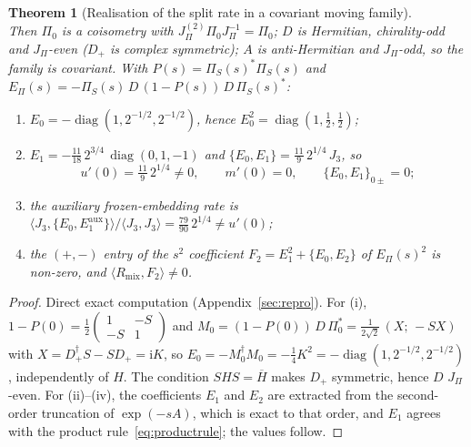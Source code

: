 \documentclass[11pt]{article}
\newtheorem{theorem}{Theorem}
\theoremstyle{definition}
\theoremstyle{remark}
\newcommand{\JPi}{J_{\Pi}}
\newcommand{\Jthree}{J_{3}}
\newcommand{\Rmix}{R_{\mathrm{mix}}}
\newcommand{\Epi}{E_{\Pi}}
\newcommand{\PiS}{\Pi_{S}}
\newcommand{\diag}{\operatorname{diag}}
\begin{document}
\begin{theorem}[Realisation of the split rate in a covariant moving family]
\[      \]
      Then $\Pi_0$ is a coisometry with $\JPi^{(2)} \Pi_0 \JPi^{-1} = \Pi_0$; $D$ is Hermitian, chirality-odd and
      $\JPi$-even ($D_+$ is complex symmetric); $A$ is anti-Hermitian and $\JPi$-odd, so the family is covariant.
      With $P(s) = \PiS(s)^{*}\PiS(s)$ and $\Epi(s) = -\PiS(s)\,D\,(1-P(s))\,D\,\PiS(s)^{*}$:
      \begin{enumerate}
        \item[(i)] $E_0 = -\diag(1, 2^{-1/2}, 2^{-1/2})$, hence $E_0^2 = \diag(1, \tfrac12, \tfrac12)$;
        \item[(ii)] $E_1 = -\tfrac{11}{18}\,2^{3/4}\,\diag(0, 1, -1)$ and
          $\{E_0, E_1\} = \tfrac{11}{9}\,2^{1/4}\,\Jthree$, so
          \begin{equation}
            \label{eq:witnessrate}
            u'(0) = \tfrac{11}{9}\,2^{1/4} \neq 0,
            \qquad m'(0) = 0,
            \qquad \{E_0, E_1\}_{0\pm} = 0;
          \end{equation}
        \item[(iii)] the auxiliary frozen-embedding rate is $\langle \Jthree, \{E_0, E_1^{\mathrm{aux}}\}\rangle /
          \langle \Jthree, \Jthree\rangle = \tfrac{79}{90}\,2^{1/4} \neq u'(0)$;
        \item[(iv)] the $(+,-)$ entry of the $s^2$ coefficient $F_2 = E_1^2 + \{E_0, E_2\}$ of $\Epi(s)^2$ is non-zero,
          and $\langle \Rmix, F_2\rangle \neq 0$.
      \end{enumerate}
    \end{theorem}

    \begin{proof}
      Direct exact computation (Appendix~\ref{sec:repro}).
      For (i), $1 - P(0) = \tfrac12 \left(\begin{smallmatrix} 1 & -S \\ -S & 1 \end{smallmatrix}\right)$ and
      $M_0 = (1-P(0))\,D\,\Pi_0^{*} = \tfrac{1}{2\sqrt2}\,(X;\,-SX)$ with $X = D_+^{\dagger}S - SD_+ = \mathrm{i}K$,
      so $E_0 = -M_0^{\dagger}M_0 = -\tfrac14 K^2 = -\diag(1, 2^{-1/2}, 2^{-1/2})$, independently of $H$.
      The condition $SHS = \overline{H}$ makes $D_+$ symmetric, hence $D$ $\JPi$-even.
      For (ii)--(iv), the coefficients $E_1$ and $E_2$ are extracted from the second-order truncation of $\exp(-sA)$,
      which is exact to that order, and $E_1$ agrees with the product rule~\eqref{eq:productrule}; the values follow.
    \end{proof}
\end{document}
